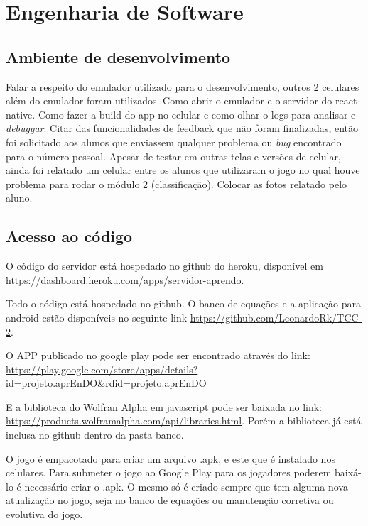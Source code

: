 \chapter[Engenharia de Software]{Engenharia de Software}











\section[Ambiente de desenvolvimento]{Ambiente de desenvolvimento}
Falar a respeito do emulador utilizado para o desenvolvimento, outros 2 celulares além do emulador foram utilizados. Como abrir o emulador e o servidor do react-native. Como fazer a build do app no celular e como olhar o logs para analisar e \textit{debuggar}.
Citar das funcionalidades de feedback que não foram finalizadas, então foi solicitado aos alunos que enviassem qualquer problema ou \textit{bug} encontrado para o número pessoal. Apesar de testar em outras telas e versões de celular, ainda foi relatado um celular entre os alunos que utilizaram o jogo no qual houve problema para rodar o módulo 2 (classificação). Colocar as fotos relatado pelo aluno.

\section[Acesso ao código]{Acesso ao código}
O código do servidor está hospedado no github do heroku, disponível em \url{https://dashboard.heroku.com/apps/servidor-aprendo}.

Todo o código está hospedado no github. O banco de equações e a aplicação para android estão disponíveis no seguinte link \url{https://github.com/LeonardoRk/TCC-2}.

O APP publicado no google play pode ser encontrado através do link: \url{https://play.google.com/store/apps/details?id=projeto.aprEnDO&rdid=projeto.aprEnDO}

E a biblioteca do Wolfran Alpha em javascript pode ser baixada no link: \url{https://products.wolframalpha.com/api/libraries.html}. Porém a biblioteca já está inclusa no github dentro da pasta banco.

O jogo é empacotado para criar um arquivo .apk, e este que é instalado nos celulares. Para submeter o jogo ao Google Play para os jogadores poderem baixá-lo é necessário criar o .apk. O mesmo só é criado sempre que tem alguma nova atualização no jogo, seja no banco de equações ou manutenção corretiva ou evolutiva do jogo.

